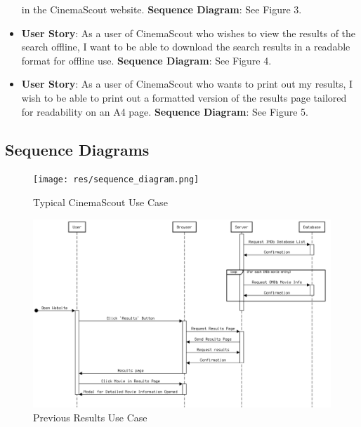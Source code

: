 \documentclass{article}
\begin{document}
\begin{itemize}
in the CinemaScout website.
\newline\textbf{Sequence Diagram}: See Figure 3.
\item \textbf{User Story}: As a user of CinemaScout who wishes to view
the results of the search offline, I want to be able to download the search
results in a readable format for offline use.
\newline\textbf{Sequence Diagram}: See Figure 4.
\item \textbf{User Story}: As a user of CinemaScout who wants to print out my
results, I wish to be able to print out a formatted version of the results page
tailored for readability on an A4 page.
\newline\textbf{Sequence Diagram}: See Figure 5.
\end{itemize}
\subsection{Sequence Diagrams}
\begin{figure}[H]
\texttt{[image: res/sequence\_diagram.png]}
\caption{Typical CinemaScout Use Case}
\end{figure}

\begin{figure}[H]
\includegraphics[width=\columnwidth]{res/sequence_diagram2.png}
\caption{Previous Results Use Case}
\end{figure}
\end{document}
